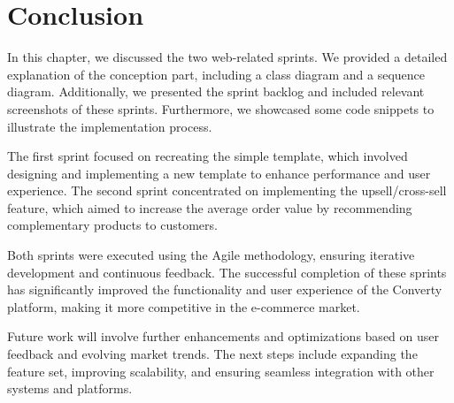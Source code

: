\section{Conclusion}

In this chapter, we discussed the two web-related sprints. We provided a detailed explanation of the conception part, including a class diagram and a sequence diagram. Additionally, we presented the sprint backlog and included relevant screenshots of these sprints. Furthermore, we showcased some code snippets to illustrate the implementation process.

The first sprint focused on recreating the simple template, which involved designing and implementing a new template to enhance performance and user experience. The second sprint concentrated on implementing the upsell/cross-sell feature, which aimed to increase the average order value by recommending complementary products to customers.

Both sprints were executed using the Agile methodology, ensuring iterative development and continuous feedback. The successful completion of these sprints has significantly improved the functionality and user experience of the Converty platform, making it more competitive in the e-commerce market.

Future work will involve further enhancements and optimizations based on user feedback and evolving market trends. The next steps include expanding the feature set, improving scalability, and ensuring seamless integration with other systems and platforms.